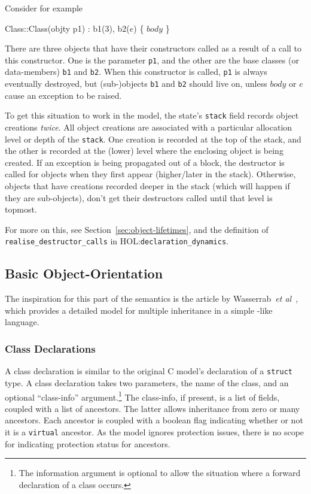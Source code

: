 \documentclass[11pt]{article}
\newcommand{\HOLfile}[1]{HOL:\texttt{#1}}
\begin{document}
Consider for example
\begin{stdrule}
  Class::Class(objty p1) : b1(3), b2(\(e\)) \{ \(\mathit{body}\) \}
\end{stdrule}
There are three objects that have their constructors called as a
result of a call to this constructor.  One is the parameter
\texttt{p1}, and the other are the base classes (or data-members)
\texttt{b1} and \texttt{b2}.  When this constructor is called,
\texttt{p1} is always eventually destroyed, but (sub-)objects
\texttt{b1} and \texttt{b2} should live on, unless $\mathit{body}$ or
$e$ cause an exception to be raised.

To get this situation to work in the model, the state's \texttt{stack}
field records object creations \emph{twice}.  All object creations are
associated with a particular allocation level or depth of the
\texttt{stack}.  One creation is recorded at the top of the stack, and
the other is recorded at the (lower) level where the enclosing object
is being created.  If an exception is being propagated out of a block,
the destructor is called for objects when they first appear
(higher/later in the stack).  Otherwise, objects that have creations
recorded deeper in the stack (which will happen if they are
sub-objects), don't get their destructors called until that level is
topmost.

For more on this, see Section~\ref{sec:object-lifetimes}, and the
definition of \texttt{realise_destructor_calls} in
\HOLfile{declaration_dynamics}.

\subsection{Basic Object-Orientation}
\label{sec:basic-oo}

The inspiration for this part of the semantics is the article by
Wasserrab~\emph{et al}~\cite{wasserrab-nst-OOPSLA06}, which provides a
detailed model for multiple inheritance in a simple \cpp-like
language.

\subsubsection{Class Declarations}
\label{sec:class-declaration}
A class declaration is similar to the original C model's declaration
of a \texttt{struct} type.  A class declaration takes two parameters,
the name of the class, and an optional ``class-info''
argument.\footnote{The information argument is optional to allow the
  situation where a forward declaration of a class occurs.}  The
class-info, if present, is a list of fields, coupled with a list of
ancestors.  The latter allows inheritance from zero or many ancestors.
Each ancestor is coupled with a boolean flag indicating whether or not
it is a \texttt{virtual} ancestor.  As the model ignores protection
issues, there is no scope for indicating protection status for
ancestors.
\end{document}
